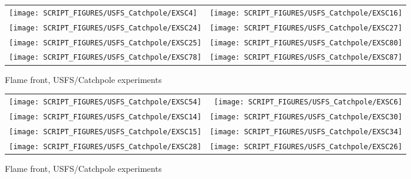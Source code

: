 \begin{figure}[p]
\begin{tabular*}{\textwidth}{l@{\extracolsep{\fill}}r}
\texttt{[image: SCRIPT\_FIGURES/USFS\_Catchpole/EXSC4]} &
\texttt{[image: SCRIPT\_FIGURES/USFS\_Catchpole/EXSC16]} \\
\texttt{[image: SCRIPT\_FIGURES/USFS\_Catchpole/EXSC24]} &
\texttt{[image: SCRIPT\_FIGURES/USFS\_Catchpole/EXSC27]} \\
\texttt{[image: SCRIPT\_FIGURES/USFS\_Catchpole/EXSC25]} &
\texttt{[image: SCRIPT\_FIGURES/USFS\_Catchpole/EXSC80]} \\
\texttt{[image: SCRIPT\_FIGURES/USFS\_Catchpole/EXSC78]} &
\texttt{[image: SCRIPT\_FIGURES/USFS\_Catchpole/EXSC87]} \\
\end{tabular*}
\caption[Flame front, USFS/Catchpole experiments]{Flame front, USFS/Catchpole experiments}
\label{USFS_Catchpole_120}
\end{figure}

\begin{figure}[p]
\begin{tabular*}{\textwidth}{l@{\extracolsep{\fill}}r}
\texttt{[image: SCRIPT\_FIGURES/USFS\_Catchpole/EXSC54]} &
\texttt{[image: SCRIPT\_FIGURES/USFS\_Catchpole/EXSC6]} \\
\texttt{[image: SCRIPT\_FIGURES/USFS\_Catchpole/EXSC14]} &
\texttt{[image: SCRIPT\_FIGURES/USFS\_Catchpole/EXSC30]} \\
\texttt{[image: SCRIPT\_FIGURES/USFS\_Catchpole/EXSC15]} &
\texttt{[image: SCRIPT\_FIGURES/USFS\_Catchpole/EXSC34]} \\
\texttt{[image: SCRIPT\_FIGURES/USFS\_Catchpole/EXSC28]} &
\texttt{[image: SCRIPT\_FIGURES/USFS\_Catchpole/EXSC26]} \\
\end{tabular*}
\caption[Flame front, USFS/Catchpole experiments]{Flame front, USFS/Catchpole experiments}
\label{USFS_Catchpole_128}
\end{figure}

